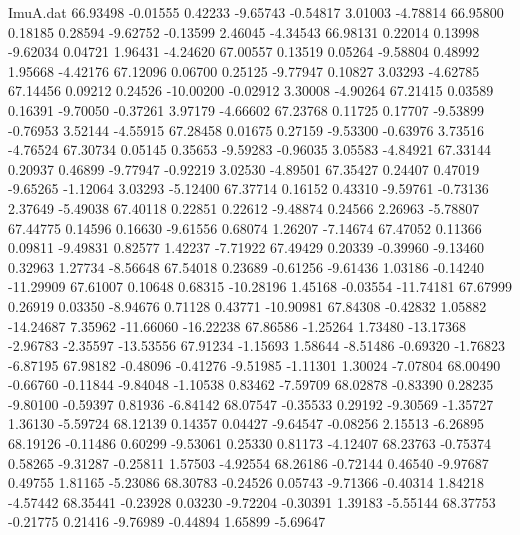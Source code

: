 \begin{filecontents}{ImuA.dat}
  66.93498   -0.01555    0.42233   -9.65743   -0.54817    3.01003   -4.78814
  66.95800    0.18185    0.28594   -9.62752   -0.13599    2.46045   -4.34543
  66.98131    0.22014    0.13998   -9.62034    0.04721    1.96431   -4.24620
  67.00557    0.13519    0.05264   -9.58804    0.48992    1.95668   -4.42176
  67.12096    0.06700    0.25125   -9.77947    0.10827    3.03293   -4.62785
  67.14456    0.09212    0.24526  -10.00200   -0.02912    3.30008   -4.90264
  67.21415    0.03589    0.16391   -9.70050   -0.37261    3.97179   -4.66602
  67.23768    0.11725    0.17707   -9.53899   -0.76953    3.52144   -4.55915
  67.28458    0.01675    0.27159   -9.53300   -0.63976    3.73516   -4.76524
  67.30734    0.05145    0.35653   -9.59283   -0.96035    3.05583   -4.84921
  67.33144    0.20937    0.46899   -9.77947   -0.92219    3.02530   -4.89501
  67.35427    0.24407    0.47019   -9.65265   -1.12064    3.03293   -5.12400
  67.37714    0.16152    0.43310   -9.59761   -0.73136    2.37649   -5.49038
  67.40118    0.22851    0.22612   -9.48874    0.24566    2.26963   -5.78807
  67.44775    0.14596    0.16630   -9.61556    0.68074    1.26207   -7.14674
  67.47052    0.11366    0.09811   -9.49831    0.82577    1.42237   -7.71922
  67.49429    0.20339   -0.39960   -9.13460    0.32963    1.27734   -8.56648
  67.54018    0.23689   -0.61256   -9.61436    1.03186   -0.14240  -11.29909
  67.61007    0.10648    0.68315  -10.28196    1.45168   -0.03554  -11.74181
  67.67999    0.26919    0.03350   -8.94676    0.71128    0.43771  -10.90981
  67.84308   -0.42832    1.05882  -14.24687    7.35962  -11.66060  -16.22238
  67.86586   -1.25264    1.73480  -13.17368   -2.96783   -2.35597  -13.53556
  67.91234   -1.15693    1.58644   -8.51486   -0.69320   -1.76823   -6.87195
  67.98182   -0.48096   -0.41276   -9.51985   -1.11301    1.30024   -7.07804
  68.00490   -0.66760   -0.11844   -9.84048   -1.10538    0.83462   -7.59709
  68.02878   -0.83390    0.28235   -9.80100   -0.59397    0.81936   -6.84142
  68.07547   -0.35533    0.29192   -9.30569   -1.35727    1.36130   -5.59724
  68.12139    0.14357    0.04427   -9.64547   -0.08256    2.15513   -6.26895
  68.19126   -0.11486    0.60299   -9.53061    0.25330    0.81173   -4.12407
  68.23763   -0.75374    0.58265   -9.31287   -0.25811    1.57503   -4.92554
  68.26186   -0.72144    0.46540   -9.97687    0.49755    1.81165   -5.23086
  68.30783   -0.24526    0.05743   -9.71366   -0.40314    1.84218   -4.57442
  68.35441   -0.23928    0.03230   -9.72204   -0.30391    1.39183   -5.55144
  68.37753   -0.21775    0.21416   -9.76989   -0.44894    1.65899   -5.69647

\end{filecontents}
